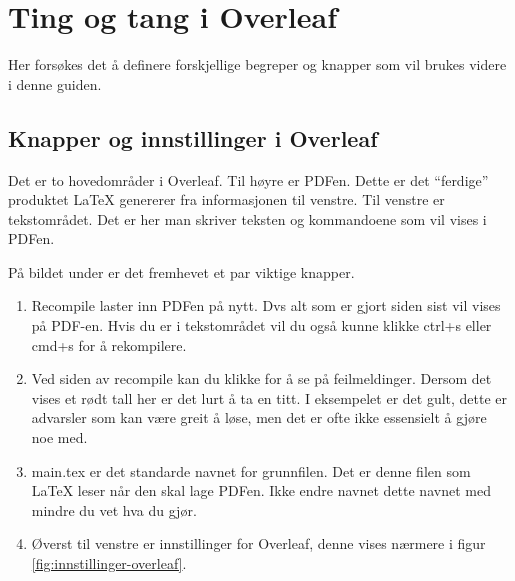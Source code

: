         
    
\section{Ting og tang i Overleaf}
    Her forsøkes det å definere forskjellige begreper og knapper som vil brukes videre i denne guiden.
    
    \subsection{Knapper og innstillinger i Overleaf}
        Det er to hovedområder i Overleaf. Til høyre er PDFen. Dette er det ``ferdige'' produktet \LaTeX\hspace{1pt} genererer fra informasjonen til venstre. Til venstre er tekstområdet. Det er her man skriver teksten og kommandoene som vil vises i PDFen.
        
        På bildet under er det fremhevet et par viktige knapper.
        \begin{enumerate}
            \item Recompile laster inn PDFen på nytt. Dvs alt som er gjort siden sist vil vises på PDF-en. Hvis du er i tekstområdet vil du også kunne klikke ctrl+s eller cmd+s for å rekompilere.
            \item Ved siden av recompile kan du klikke for å se på feilmeldinger. Dersom det vises et rødt tall her er det lurt å ta en titt. I eksempelet er det gult, dette er advarsler som kan være greit å løse, men det er ofte ikke essensielt å gjøre noe med.
            \item main.tex er det standarde navnet for grunnfilen. Det er denne filen som \LaTeX\hspace{1pt} leser når den skal lage PDFen. Ikke endre navnet dette navnet med mindre du vet hva du gjør.
            \item Øverst til venstre er innstillinger for Overleaf, denne vises nærmere i figur \ref{fig:innstillinger-overleaf}. 
        \end{enumerate}
        
        

